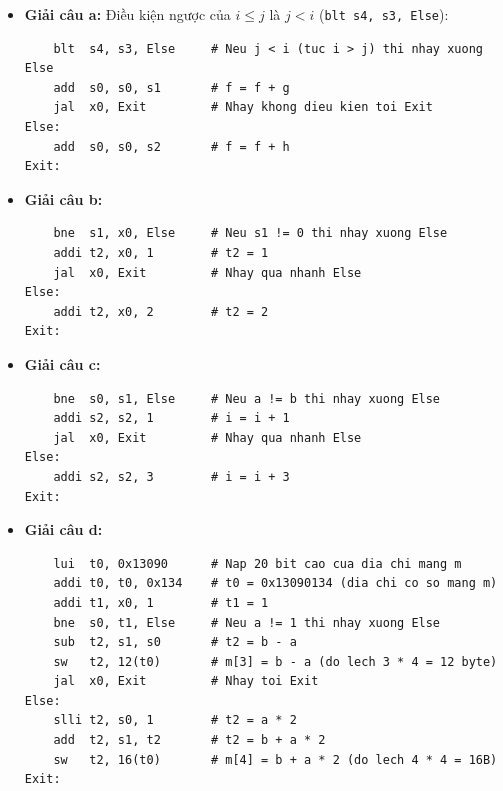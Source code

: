 \begin{itemize}
    \item \textbf{Giải câu a:} Điều kiện ngược của $i \le j$ là $j < i$ (\texttt{blt s4, s3, Else}):

\noindent\begin{minipage}{\linewidth}
\begin{lstlisting}
    blt  s4, s3, Else     # Neu j < i (tuc i > j) thi nhay xuong Else
    add  s0, s0, s1       # f = f + g
    jal  x0, Exit         # Nhay khong dieu kien toi Exit
Else:
    add  s0, s0, s2       # f = f + h
Exit:
\end{lstlisting}
\end{minipage}

    \item \textbf{Giải câu b:}

\noindent\begin{minipage}{\linewidth}
\begin{lstlisting}
    bne  s1, x0, Else     # Neu s1 != 0 thi nhay xuong Else
    addi t2, x0, 1        # t2 = 1
    jal  x0, Exit         # Nhay qua nhanh Else
Else:
    addi t2, x0, 2        # t2 = 2
Exit:
\end{lstlisting}
\end{minipage}

    \item \textbf{Giải câu c:}

\noindent\begin{minipage}{\linewidth}
\begin{lstlisting}
    bne  s0, s1, Else     # Neu a != b thi nhay xuong Else
    addi s2, s2, 1        # i = i + 1
    jal  x0, Exit         # Nhay qua nhanh Else
Else:
    addi s2, s2, 3        # i = i + 3
Exit:
\end{lstlisting}
\end{minipage}

    \item \textbf{Giải câu d:}

\noindent\begin{minipage}{\linewidth}
\begin{lstlisting}
    lui  t0, 0x13090      # Nap 20 bit cao cua dia chi mang m
    addi t0, t0, 0x134    # t0 = 0x13090134 (dia chi co so mang m)
    addi t1, x0, 1        # t1 = 1
    bne  s0, t1, Else     # Neu a != 1 thi nhay xuong Else
    sub  t2, s1, s0       # t2 = b - a
    sw   t2, 12(t0)       # m[3] = b - a (do lech 3 * 4 = 12 byte)
    jal  x0, Exit         # Nhay toi Exit
Else:
    slli t2, s0, 1        # t2 = a * 2
    add  t2, s1, t2       # t2 = b + a * 2
    sw   t2, 16(t0)       # m[4] = b + a * 2 (do lech 4 * 4 = 16B)
Exit:
\end{lstlisting}
\end{minipage}
\end{itemize}

